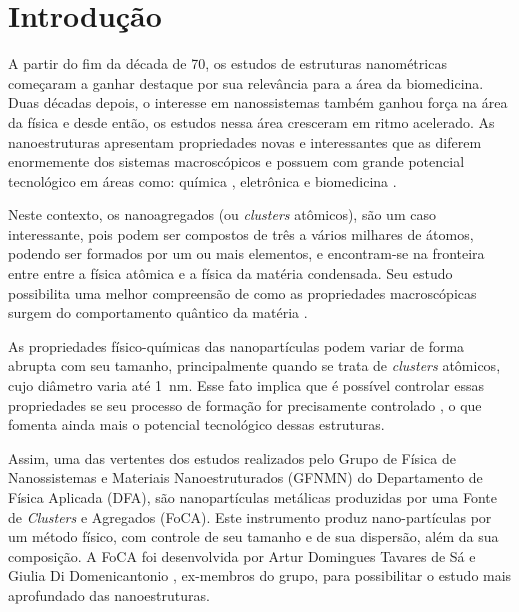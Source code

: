 \chapter{Introdução}

A partir do fim da década de 70, os estudos de estruturas nanométricas começaram a ganhar destaque por sua relevância para a área da biomedicina. Duas décadas depois, o interesse em nanossistemas também ganhou força na área da física e desde então, os estudos nessa área cresceram em ritmo acelerado. As nanoestruturas apresentam propriedades novas e interessantes que as diferem enormemente dos sistemas macroscópicos e possuem com grande potencial tecnológico em áreas como: química \cite{catalise}, eletrônica \cite{semicondutores} e biomedicina \cite{antimicrobial_effects, drug_delivery}.


Neste contexto, os nanoagregados (ou \textit{clusters} atômicos), são um caso interessante, pois podem ser compostos de três a vários milhares de átomos, podendo ser formados por um ou mais elementos, e encontram-se na fronteira entre entre a física atômica e a física da matéria condensada.
Seu estudo possibilita uma melhor compreensão de como as propriedades macroscópicas surgem do comportamento quântico da matéria \cite{Heer,Brack}.

As propriedades físico-químicas das nanopartículas podem variar de forma abrupta com seu tamanho, principalmente quando se trata de \textit{clusters} atômicos, cujo diâmetro varia até \mbox{1 nm}. Esse fato implica que é possível controlar essas propriedades se seu processo de formação for precisamente controlado  \cite{energetic_thermodynamic}, o que fomenta ainda mais o potencial tecnológico dessas estruturas.


Assim, uma das vertentes dos estudos realizados pelo Grupo   de   Física   de   Nanossistemas   e Materiais  Nanoestruturados  (GFNMN)  do  Departamento de  Física  Aplicada  (DFA),  são nanopartículas metálicas produzidas por uma Fonte de \textit{Clusters} e Agregados (FoCA). Este instrumento produz nano-partículas por um método físico, com controle de seu tamanho e de sua dispersão, além da sua composição. A FoCA foi desenvolvida por Artur Domingues Tavares de Sá e Giulia Di Domenicantonio \cite{tese_artur}, ex-membros do grupo, para possibilitar o estudo mais aprofundado das nanoestruturas.

